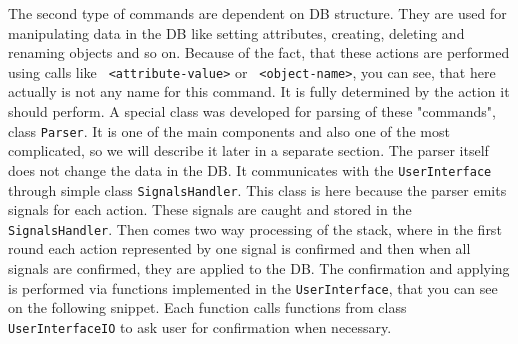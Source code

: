 \documentclass[deska]{subfiles}
\begin{document}
The second type of commands are dependent on DB structure. They are used for manipulating data in the DB like setting attributes,
creating, deleting and renaming objects and so on. Because of the fact, that these actions are performed using calls
like {\tt <attribute-name> <attribute-value>} or {\tt <kind-name> <object-name>}, you can see, that here actually is not any
name for this command. It is fully determined by the action it should perform. A special class was developed for parsing
of these "commands", class {\tt Parser}. It is one of the main components and also one of the most complicated, so we will
describe it later in a separate section. The parser itself does not change the data in the DB. It communicates with the
{\tt UserInterface} through simple class {\tt SignalsHandler}. This class is here because the parser emits signals for
each action. These signals are caught and stored in the {\tt SignalsHandler}. Then comes two way processing of the stack,
where in the first round each action represented by one signal is confirmed and then when all signals are confirmed, they
are applied to the DB. The confirmation and applying is performed via functions implemented in the {\tt UserInterface},
that you can see on the following snippet. Each function calls functions from class {\tt UserInterfaceIO}
to ask user for confirmation when necessary.
\end{document}
